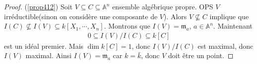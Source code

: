         \begin{proof} (\ref{prop412})
            Soit $V \subseteq C \subseteq \mathbb{A}^n$ ensemble algébrique propre. OPS $V$ irréductible(sinon on considère une composante de $V$). Alors $V \nsubseteq C$ implique que $I(C) \nsubseteq I(V) \subseteq k[X_1, \cdots, X_n]$. Montrons que $I(V) = \mathfrak{m}_a$, $a \in \mathbb{A}^n$. Maintenant
            \begin{align*}
                0 \subseteq I(V)/I(C) \subseteq k[C]
            \end{align*}
            est un idéal premier. Mais $\dim k[C] = 1$, donc $I(V)/I(C)$ est maximal, donc $I(V)$ maximal. Ainsi $I(V) = \mathfrak{m}_a$ car $k = \bar k$, donc $V$ doit être un point.
        \end{proof}